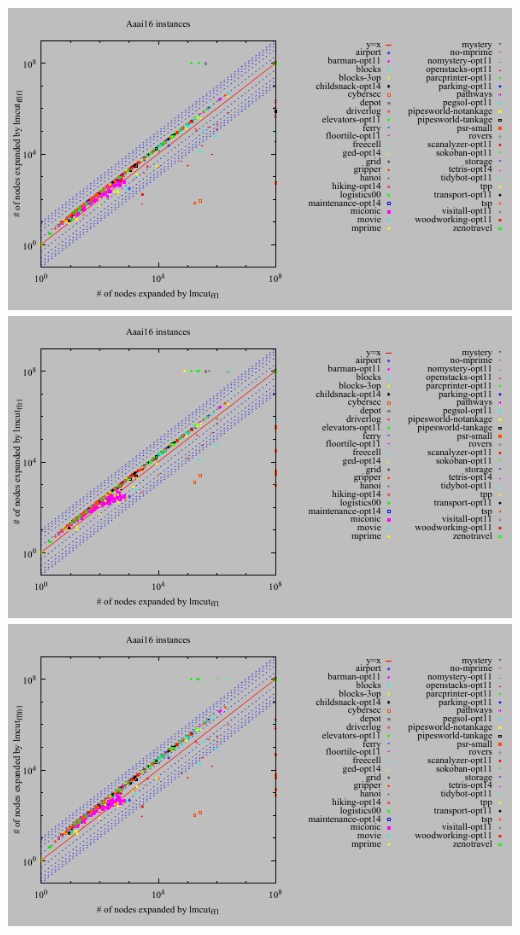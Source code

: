 \includegraphics{tables/aaai16-expanded-lmcut_ff-lmcut_fflf.pdf}
\linebreak
\includegraphics{tables/aaai16-expanded-lmcut_ff-lmcut_ffr.pdf}
\linebreak
\includegraphics{tables/aaai16-expanded-lmcut_ff-lmcut_fflfr.pdf}
\linebreak
